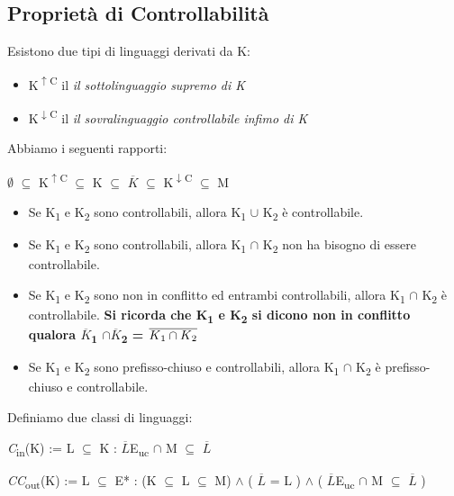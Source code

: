 \documentclass[a4paper]{article}
\begin{document}
\subsection{Proprietà di Controllabilità}
Esistono due tipi di linguaggi derivati da K:
\begin{itemize}
\item K\textsuperscript{$\uparrow$C} il \textit{il sottolinguaggio supremo di K}
\item K\textsuperscript{$\downarrow$C} il \textit{il sovralinguaggio controllabile infimo di K}
\end{itemize}
Abbiamo i seguenti rapporti: 
\begin{center}
$\emptyset$ $\subseteq$ K\textsuperscript{$\uparrow$C} $\subseteq$ K $\subseteq$ $\overline{K}$ $\subseteq$ K\textsuperscript{$\downarrow$C} $\subseteq$ M
\end{center}
\begin{itemize}
\item Se K\textsubscript{1} e K\textsubscript{2} sono controllabili, allora K\textsubscript{1} $\cup$ K\textsubscript{2} è controllabile. 
\item Se K\textsubscript{1} e K\textsubscript{2} sono controllabili, allora K\textsubscript{1} $\cap$ K\textsubscript{2} non ha bisogno di essere controllabile.
\item Se K\textsubscript{1} e K\textsubscript{2} sono non in conflitto ed entrambi controllabili, allora K\textsubscript{1} $\cap$ K\textsubscript{2} è controllabile. \textbf{Si ricorda che K\textsubscript{1} e K\textsubscript{2} si dicono non in conflitto qualora $\overline{K}$\textsubscript{1} $\cap \overline{K}$\textsubscript{2} = $\overline{ K\textsubscript{1} \cap K\textsubscript{2} }$ }
\item Se K\textsubscript{1} e K\textsubscript{2} sono prefisso-chiuso e controllabili, allora K\textsubscript{1} $\cap$ K\textsubscript{2} è prefisso-chiuso e controllabile.
\end{itemize}
Definiamo due classi di linguaggi: 
\begin{center}
\textit{C}\textsubscript{in}(K) := {L $\subseteq$ K : $\overline{L}$E\textsubscript{uc} $\cap$ M $\subseteq$ $\overline{L}$}
\end{center}
\begin{center}
\textit{CC}\textsubscript{out}(K) := { L $\subseteq$ E* : (K $\subseteq$ L $\subseteq$ M) $\land$ ( $\overline{L}$ = L ) $\land$ ( $\overline{L}$E\textsubscript{uc} $\cap$ M $\subseteq$ $\overline{L}$ ) }
\end{center}
\end{document}
